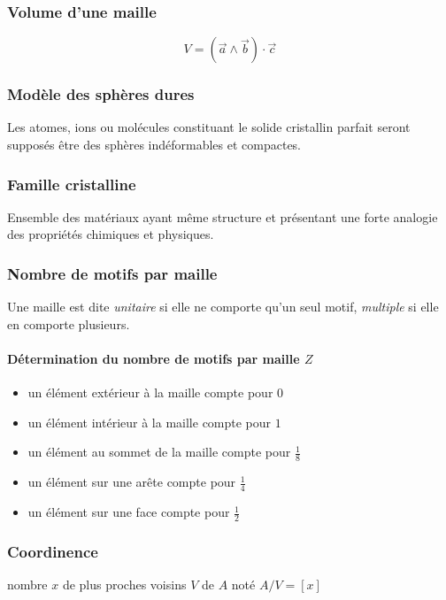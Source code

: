 \subsubsection{Volume d'une maille}
\begin{prop}
    \begin{equation}
        V = (\vec{a} \wedge \vec{b}) \cdot \vec{c}
        \label{eq:volume}
    \end{equation}
\end{prop}

\subsubsection{Modèle des sphères dures}
Les atomes, ions ou molécules constituant le solide cristallin parfait seront
supposés être des sphères indéformables et compactes.

\subsubsection{Famille cristalline}
Ensemble des matériaux ayant même structure et présentant une forte analogie des
propriétés chimiques et physiques.

\subsubsection{Nombre de motifs par maille}
Une maille est dite \emph{unitaire} si elle ne comporte qu'un seul motif,
\emph{multiple} si elle en comporte plusieurs.
\paragraph{Détermination du nombre de motifs par maille $Z$}
\begin{itemize}
    \item un élément extérieur à la maille compte pour $0$
    \item un élément intérieur à la maille compte pour $1$
    \item un élément au sommet de la maille compte pour $\frac{1}{8}$
    \item un élément sur une arête compte pour $\frac{1}{4}$
    \item un élément sur une face compte pour $\frac{1}{2}$
\end{itemize}

\subsubsection{Coordinence}
\begin{defi}
    nombre $x$ de plus proches voisins $V$ de $A$ noté $A/V = [x]$
\end{defi}

